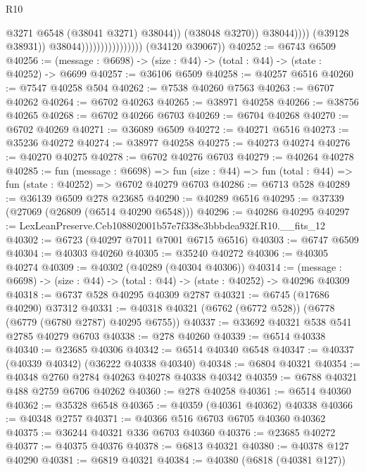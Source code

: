 \begin{lexlean}{R10}
\begin{coremodule}
                                                      @3271
                                                      @6548
                                                      (@38041 @3271)
                                                      @38044))
                                                  (@38048 @3270))
                                                @38044))))
                                        (@39128 @38931))
                                      @38044))))))))))))))))
      (@34120 @39067))
@40252 := @6743 @6509
@40256 := (message : @6698) -> (size : @44) -> (total : @44) -> (state : @40252) -> @6699
@40257 := @36106 @6509
@40258 := @40257 @6516
@40260 := @7547 @40258 @504
@40262 := @7538 @40260 @7563
@40263 := @6707 @40262
@40264 := @6702 @40263
@40265 := @38971 @40258
@40266 := @38756 @40265
@40268 := @6702 @40266 @6703
@40269 := @6704 @40268
@40270 := @6702 @40269
@40271 := @36089 @6509
@40272 := @40271 @6516
@40273 := @35236 @40272
@40274 := @38977 @40258
@40275 := @40273 @40274
@40276 := @40270 @40275
@40278 := @6702 @40276 @6703
@40279 := @40264 @40278
@40285 := fun (message : @6698) =>
  fun (size : @44) => fun (total : @44) => fun (state : @40252) => @6702 @40279 @6703
@40286 := @6713 @528
@40289 := @36139 @6509 @278 @23685
@40290 := @40289 @6516
@40295 := @37339 (@27069 (@26809 (@6514 @40290 @6548)))
@40296 := @40286 @40295
@40297 := LexLeanPreserve.Ceb108802001b57e7f338e3bbbdea932f.R10.__fits_12
@40302 := @6723 (@40297 @7011 @7001 @6715 @6516)
@40303 := @6747 @6509
@40304 := @40303 @40260
@40305 := @35240 @40272
@40306 := @40305 @40274
@40309 := @40302 (@40289 (@40304 @40306))
@40314 := (message : @6698) -> (size : @44) -> (total : @44) -> (state : @40252) -> @40296 @40309
@40318 := @6737 @528 @40295 @40309 @2787
@40321 := @6745 (@17686 @40290) @37312
@40331 := @40318 @40321 (@6762 (@6772 @528)) (@6778 (@6779 (@6780 @2787) @40295 @6755))
@40337 := @33692 @40321 @538 @541 @2785 @40279 @6703
@40338 := @278 @40260
@40339 := @6514 @40338
@40340 := @23685 @40306
@40342 := @6514 @40340 @6548
@40347 := @40337 (@40339 @40342) (@36222 @40338 @40340)
@40348 := @6804 @40321
@40354 := @40348 @2760 @2784 @40263 @40278 @40338 @40342
@40359 := @6788 @40321 @488 @2759 @6706 @40262
@40360 := @278 @40258
@40361 := @6514 @40360
@40362 := @35328 @6548
@40365 := @40359 (@40361 @40362) @40338
@40366 := @40348 @2757
@40371 := @40366 @516 @6703 @6705 @40360 @40362
@40375 := @36244 @40321 @336 @6703 @40360
@40376 := @23685 @40272
@40377 := @40375 @40376
@40378 := @6813 @40321
@40380 := @40378 @127 @40290
@40381 := @6819 @40321
@40384 := @40380 (@6818 (@40381 @127))

\end{coremodule}
\end{lexlean}
